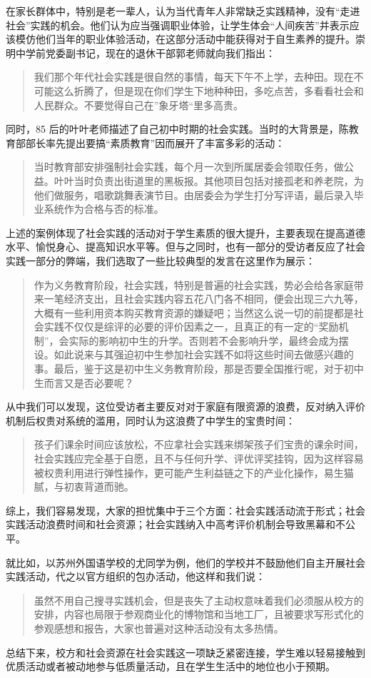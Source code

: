 \documentclass[12pt,UTF8]{ctexart}
\begin{document}
\par {
	
	在家长群体中，特别是老一辈人，认为当代青年人非常缺乏实践精神，没有“走进社会”实践的机会。他们认为应当强调职业体验，让学生体会“人间疾苦”并表示应该模仿他们当年的职业体验活动，在这部分活动中能获得对于自生素养的提升。崇明中学前党委副书记，现在的退休干部郭老师就向我们指出：
	\begin{quote}
		\kaishu
		我们那个年代社会实践是很自然的事情，每天下午不上学，去种田。现在不可能这么折腾了，但是现在你们学生下地种种田，多吃点苦，多看看社会和人民群众。不要觉得自己在”象牙塔“里多高贵。
	\end{quote}
	同时，85 后的叶叶老师描述了自己初中时期的社会实践。当时的大背景是，陈教育部部长率先提出要搞“素质教育”因而展开了丰富多彩的活动：
	\begin{quote}
		\kaishu
		当时教育部安排强制社会实践，每个月一次到所属居委会领取任务，做公益。叶叶当时负责出街道里的黑板报。其他项目包括对接孤老和养老院，为他们做服务，唱歌跳舞表演节目。由居委会为学生打分写评语，最后录入毕业系统作为合格与否的标准。
	\end{quote}
	
	上述的案例体现了社会实践的活动对于学生素质的很大提升，主要表现在提高道德水平、愉悦身心、提高知识水平等。但与之同时，也有一部分的受访者反应了社会实践一部分的弊端，我们选取了一些比较典型的发言在这里作为展示：
	\begin{quote}
		\kaishu
		作为义务教育阶段，社会实践，特别是普遍的社会实践，势必会给各家庭带来一笔经济支出，且社会实践内容五花八门各不相同，便会出现三六九等，大概有一些利用资本购买教育资源的嫌疑吧；当然这么说一切的前提都是社会实践不仅仅是综评的必要的评价因素之一，且真正的有一定的“奖励机制”，会实际的影响初中生的升学。否则若不会影响升学，最终会成为摆设。如此说来与其强迫初中生参加社会实践不如将这些时间去做感兴趣的事。最后，鉴于这是初中生义务教育阶段，那是否要全国推行呢，对于初中生而言又是否必要呢？
	\end{quote}
	从中我们可以发现，这位受访者主要反对对于家庭有限资源的浪费，反对纳入评价机制后权贵对系统的滥用，同时认为这浪费了中学生的宝贵时间：
	\begin{quote}
		\kaishu
		孩子们课余时间应该放松，不应拿社会实践来绑架孩子们宝贵的课余时间，社会实践应完全基于自愿，且不与任何升学、评优评奖挂钩，因为这样容易被权贵利用进行弹性操作，更可能产生利益链之下的产业化操作，易生猫腻，与初衷背道而驰。
	\end{quote}
	综上，我们容易发现，大家的担忧集中于三个方面：社会实践活动流于形式；社会实践活动浪费时间和社会资源；社会实践纳入中高考评价机制会导致黑幕和不公平。
}
\par {
	就比如，以苏州外国语学校的尤同学为例，他们的学校并不鼓励他们自主开展社会实践活动，代之以官方组织的包办活动，他这样和我们说：
	\begin{quote}
		\kaishu
		虽然不用自己搜寻实践机会，但是丧失了主动权意味着我们必须服从校方的安排，内容也局限于参观商业化的博物馆和当地工厂，且被要求写形式化的参观感想和报告，大家也普遍对这种活动没有太多热情。
	\end{quote}
	总结下来，校方和社会资源在社会实践这一项缺乏紧密连接，学生难以轻易接触到优质活动或者被动地参与低质量活动，且在学生生活中的地位也小于预期。
}
\end{document}
